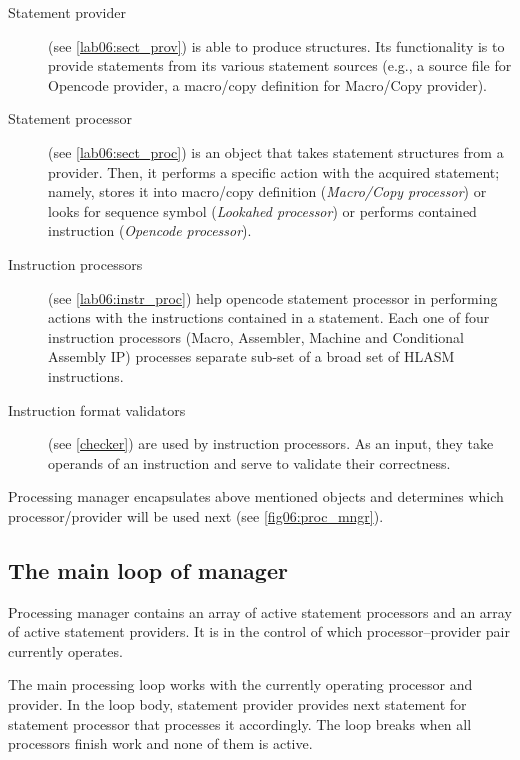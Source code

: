 \begin{description}
	\item[Statement provider] (see \cref{lab06:sect_prov}) is able to produce  structures. Its functionality is to provide statements from its various statement sources (e.g., a source file for Opencode provider, a macro/copy definition for Macro/Copy provider).
	
	\item[Statement processor] (see \cref{lab06:sect_proc}) is an object that takes statement structures from a provider. Then, it performs a specific action with the acquired statement; namely, stores it into macro/copy definition (\emph{Macro/Copy processor}) or looks for sequence symbol (\emph{Lookahed processor}) or performs contained instruction (\emph{Opencode processor}).
	
	\item[Instruction processors] (see \cref{lab06:instr_proc}) help opencode statement processor in performing actions with the instructions contained in a statement. Each one of four instruction processors (Macro, Assembler, Machine and Conditional Assembly IP) processes separate sub-set of a broad set of HLASM instructions. 
	
	\item[Instruction format validators] (see \cref{checker}) are used by instruction processors. As an input, they take operands of an instruction and serve to validate their correctness. 
	
\end{description}

Processing manager encapsulates above mentioned objects and determines which processor/provider will be used next (see \cref{fig06:proc_mngr}).


\subsection{The main loop of manager}
\label{lab06:mngr_loop}

Processing manager contains an array of active statement processors and an array of active statement providers. It is in the control of which processor--provider pair currently operates.

The main processing loop works with the currently operating processor and provider. In the loop body, statement provider provides next statement for statement processor that processes it accordingly. The loop breaks when all processors finish work and none of them is active.

